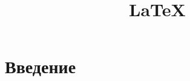 \documentclass[12pt]{article}
\title{\LaTeX}
\date{}
\author{}
\begin{document}
\thispagestyle{empty}
\section*{Введение}

\section{}


\end{document}
